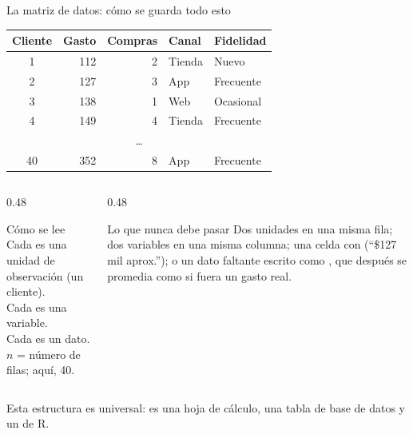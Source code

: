 \documentclass[aspectratio=169,10pt]{beamer}
\begin{document}
\begin{frame}{La matriz de datos: cómo se guarda todo esto}
  \scriptsize
  \begin{center}
  \begin{tabular}{@{}crrll@{}}
    \toprule
    \textbf{Cliente} & \textbf{Gasto} & \textbf{Compras} &
    \textbf{Canal} & \textbf{Fidelidad} \\
    \midrule
    1 & 112 & 2 & Tienda & Nuevo \\
    2 & 127 & 3 & App    & Frecuente \\
    3 & 138 & 1 & Web    & Ocasional \\
    4 & 149 & 4 & Tienda & Frecuente \\
    \multicolumn{5}{c}{\dots} \\
    40 & 352 & 8 & App   & Frecuente \\
    \bottomrule
  \end{tabular}
  \end{center}

  \vspace{0.1cm}
  \begin{columns}[T,onlytextwidth]
    \begin{column}{0.48\textwidth}
      \begin{block}{Cómo se lee}
        \tiny
        Cada  es una unidad de observación (un cliente). \\
        Cada  es una variable. \\
        Cada  es un dato. \\
        $n$ = número de filas; aquí, 40.
      \end{block}
    \end{column}
    \begin{column}{0.48\textwidth}
      \begin{alertblock}{Lo que nunca debe pasar}
        \tiny
        Dos unidades en una misma fila; dos variables en una misma columna;
        una celda con 
        (``\$127 mil aprox.''); o un dato faltante escrito como ,
        que después se promedia como si fuera un gasto real.
      \end{alertblock}
    \end{column}
  \end{columns}

  \vspace{0.05cm}
  {\tiny\color{uniGris} Esta estructura es universal: es una hoja de cálculo,
  una tabla de base de datos y un  de R. }
\end{frame}
\end{document}
